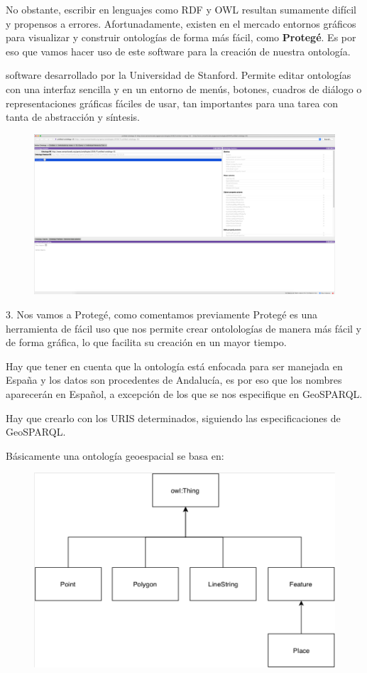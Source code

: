 No obstante, escribir en lenguajes como RDF y OWL resultan sumamente difícil y propensos a errores. Afortunadamente, existen en el mercado entornos gráficos para visualizar y construir ontologías de forma más fácil, como \textbf{Protegé}. Es por eso que vamos hacer uso de este software para la creación de nuestra ontología.


software desarrollado por la Universidad de Stanford. Permite editar ontologías con una interfaz sencilla y en un entorno de menús, botones, cuadros de diálogo o representaciones gráficas fáciles de usar, tan importantes para una tarea con tanta de abstracción y síntesis.


\begin{figure}[H]
	\centering
	\includegraphics[width=0.7\linewidth]{imagenes/capitulo4/protege}
	\caption{}
	\label{fig:protege}
\end{figure}

3. Nos vamos a Protegé, como comentamos previamente Protegé es una herramienta de fácil uso que nos permite crear ontolologías de manera más fácil y de forma gráfica, lo que facilita su creación en un mayor tiempo. 

Hay que tener en cuenta que la ontología está enfocada para ser manejada en España y los datos son procedentes de Andalucía, es por eso que los nombres aparecerán en Español, a excepción de los que se nos especifique en GeoSPARQL.

Hay que crearlo con los URIS determinados, siguiendo las especificaciones de GeoSPARQL.

Básicamente una ontología geoespacial se basa en:

\begin{figure}[H]
	\centering
	\includegraphics[width=0.7\linewidth]{imagenes/capitulo4/ontologia-geosparql}
	\caption{}
	\label{fig:ontologia-geosparql}
\end{figure}

